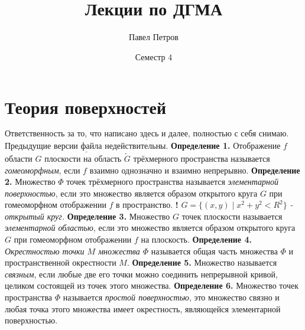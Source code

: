 \documentclass[12pt,a4paper]{article}
\author{Павел Петров}
\title{Лекции по ДГМА}
\date{Семестр 4}
\begin{document}
	\maketitle
	\newpage
	\section{Теория поверхностей}
	$\underline{\textbf{Ответственность за то, что написано здесь и далее, полностью с себя снимаю.}}$
	\newline
	$\underline{\textbf{Предыдущие версии файла недействительны.}}$
	\newline
	\newline
	\textbf{Определение 1.} Отображение $f$ области $G$ плоскости на область $\widetilde{G}$ трёхмерного пространства называется \textit{гомеоморфным}, если $f$ взаимно однозначно и взаимно непрерывно. 
	\newline
	\newline
	\textbf{Определение 2.} Множество $\Phi$ точек трёхмерного пространства называется \textit{элементарной поверхностью}, если это множество является образом открытого круга $G$ при гомеоморфном отображении $f$ в пространство. 
	\newline
	\newline
	\textbf{!} $G = \{(x,y)\; |\; x^2 + y^2 < R^2 \}$  \textit{- открытый круг.}
	\newline
	\newline
	\textbf{Определение 3.} Множество $G$ точек плоскости называется \textit{элементарной областью}, если это множество является образом открытого круга $G$ при гомеоморфном отображении $f$ на плоскость. 
	\newline
	\newline
	\textbf{Определение 4.} \textit{Окрестностью точки $M$ множества $\Phi$} называется общая часть множества $\Phi$ и пространственной окрестности $M$.
	\newline
	\newline
	\textbf{Определение 5.} Множество называется \textit{связным}, если любые две его точки можно соединить непрерывной кривой, целиком состоящей из точек этого множества.
	\newline
	\newline
	\textbf{Определение 6.} Множество точек пространства $\Phi$ называется \textit{простой поверхностью}, это множество связно и любая точка этого множества имеет окрестность, являющейся элементарной поверхностью.
	\newline
	\newline
\end{document}
